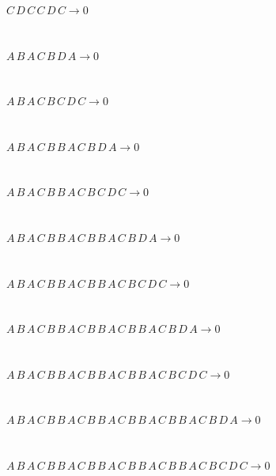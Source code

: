 \documentclass[rep10,leqno]{report}
\begin{document}
\begin{minipage}{6in}
$
C\,
 D\,
 C\,
 C\,
 D\,
 C\rightarrow 0
$
\end{minipage}\medskip \\
\begin{minipage}{6in}
$
A\,
 B\,
 A\,
 C\,
 B\,
 D\,
 A\rightarrow 0
$
\end{minipage}\medskip \\
\begin{minipage}{6in}
$
A\,
 B\,
 A\,
 C\,
 B\,
 C\,
 D\,
 C\rightarrow 0
$
\end{minipage}\medskip \\
\begin{minipage}{6in}
$
A\,
 B\,
 A\,
 C\,
 B\,
 B\,
 A\,
 C\,
 B\,
 D\,
 A\rightarrow 0
$
\end{minipage}\medskip \\
\begin{minipage}{6in}
$
A\,
 B\,
 A\,
 C\,
 B\,
 B\,
 A\,
 C\,
 B\,
 C\,
 D\,
 C\rightarrow 0
$
\end{minipage}\medskip \\
\begin{minipage}{6in}
$
A\,
 B\,
 A\,
 C\,
 B\,
 B\,
 A\,
 C\,
 B\,
 B\,
 A\,
 C\,
 B\,
 D\,
 A\rightarrow 0
$
\end{minipage}\medskip \\
\begin{minipage}{6in}
$
A\,
 B\,
 A\,
 C\,
 B\,
 B\,
 A\,
 C\,
 B\,
 B\,
 A\,
 C\,
 B\,
 C\,
 D\,
 C\rightarrow 0
$
\end{minipage}\medskip \\
\begin{minipage}{6in}
$
A\,
 B\,
 A\,
 C\,
 B\,
 B\,
 A\,
 C\,
 B\,
 B\,
 A\,
 C\,
 B\,
 B\,
 A\,
 C\,
 B\,
 D\,
 A\rightarrow 0
$
\end{minipage}\medskip \\
\begin{minipage}{6in}
$
A\,
 B\,
 A\,
 C\,
 B\,
 B\,
 A\,
 C\,
 B\,
 B\,
 A\,
 C\,
 B\,
 B\,
 A\,
 C\,
 B\,
 C\,
 D\,
 C\rightarrow 0
$
\end{minipage}\medskip \\
\begin{minipage}{6in}
$
A\,
 B\,
 A\,
 C\,
 B\,
 B\,
 A\,
 C\,
 B\,
 B\,
 A\,
 C\,
 B\,
 B\,
 A\,
 C\,
 B\,
 B\,
 A\,
 C\,
 B\,
 D\,
 A\rightarrow 0
$
\end{minipage}\medskip \\
\begin{minipage}{6in}
$
A\,
 B\,
 A\,
 C\,
 B\,
 B\,
 A\,
 C\,
 B\,
 B\,
 A\,
 C\,
 B\,
 B\,
 A\,
 C\,
 B\,
 B\,
 A\,
 C\,
 B\,
 C\,
 D\,
 C\rightarrow 0
$
\end{minipage}\\
\vspace{10pt}
\end{document}
